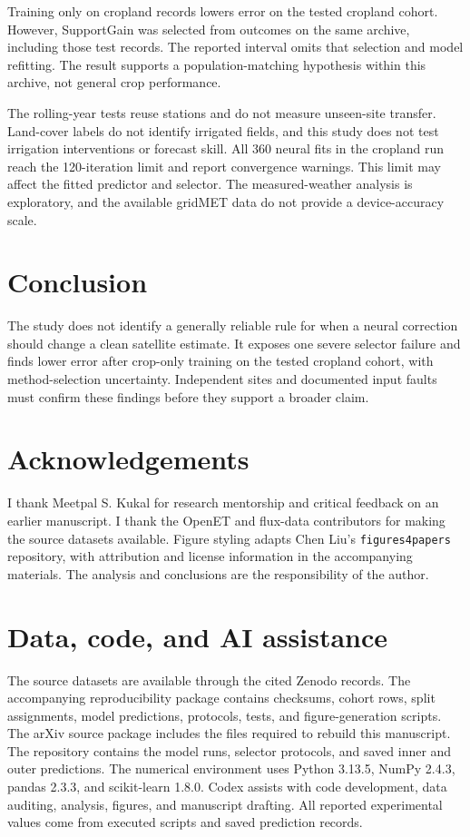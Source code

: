 \documentclass[10pt,letterpaper]{article}
\begin{document}
Training only on cropland records lowers error on the tested cropland cohort.
However, SupportGain was selected from outcomes on the same archive, including those test records.
The reported interval omits that selection and model refitting.
The result supports a population-matching hypothesis within this archive, not general crop performance.

The rolling-year tests reuse stations and do not measure unseen-site transfer.
Land-cover labels do not identify irrigated fields, and this study does not test irrigation interventions or forecast skill.
All 360 neural fits in the cropland run reach the 120-iteration limit and report convergence warnings.
This limit may affect the fitted predictor and selector.
The measured-weather analysis is exploratory, and the available gridMET data do not provide a device-accuracy scale.
\section{Conclusion}
The study does not identify a generally reliable rule for when a neural correction should change a clean satellite estimate.
It exposes one severe selector failure and finds lower error after crop-only training on the tested cropland cohort, with method-selection uncertainty.
Independent sites and documented input faults must confirm these findings before they support a broader claim.
\section*{Acknowledgements}
I thank Meetpal S. Kukal for research mentorship and critical feedback on an earlier manuscript.
I thank the OpenET and flux-data contributors for making the source datasets available.
Figure styling adapts Chen Liu's \texttt{figures4papers} repository, with attribution and license information in the accompanying materials.
The analysis and conclusions are the responsibility of the author.

\section*{Data, code, and AI assistance}
The source datasets are available through the cited Zenodo records.
The accompanying reproducibility package contains checksums, cohort rows, split assignments, model predictions, protocols, tests, and figure-generation scripts.
The arXiv source package includes the files required to rebuild this manuscript.
The repository contains the model runs, selector protocols, and saved inner and outer predictions.
The numerical environment uses Python 3.13.5, NumPy 2.4.3, pandas 2.3.3, and scikit-learn 1.8.0.
Codex assists with code development, data auditing, analysis, figures, and manuscript drafting.
All reported experimental values come from executed scripts and saved prediction records.
\end{document}
